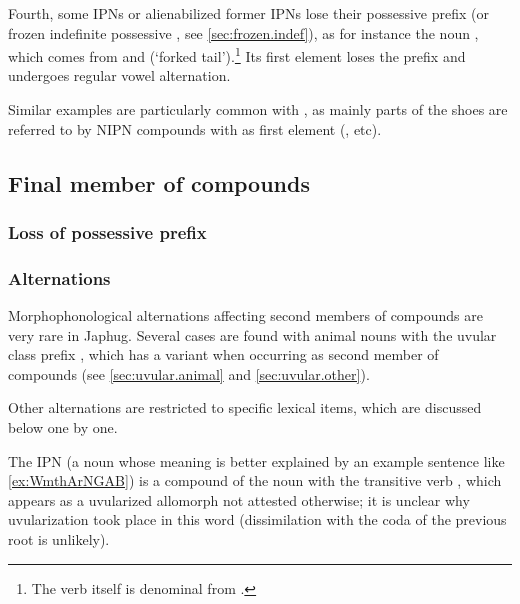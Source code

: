 Fourth, some IPNs or alienabilized former IPNs lose their possessive prefix (or frozen indefinite possessive , see \ref{sec:frozen.indef}), as for instance the noun  , which comes from  and  (`forked tail').\footnote{The verb  itself is denominal from .} Its first element  loses the prefix  and undergoes regular vowel alternation.

Similar examples are particularly common with , as mainly parts of the shoes are referred to by NIPN compounds with  as first element (,  etc).

\subsection{Final member of compounds} \label{sec:final.compounds}
\subsubsection{Loss of possessive prefix} \label{sec:possessive.prefix.second.compound}

\subsubsection{Alternations} \label{sec:second.member.alternation}
Morphophonological alternations affecting second members of compounds are very rare in Japhug. Several cases are found with animal nouns with the uvular class prefix , which has a variant  when occurring as second member of compounds (see \ref{sec:uvular.animal} and \ref{sec:uvular.other}).

Other alternations are restricted to specific lexical items, which are discussed below one by one.

The IPN  (a noun whose meaning is better explained by an example sentence like \ref{ex:WmthArNGAB}) is a compound of the noun  with the transitive verb , which appears as a uvularized allomorph  not attested otherwise; it is unclear why uvularization took place in this word (dissimilation with the coda  of the previous root is unlikely).


